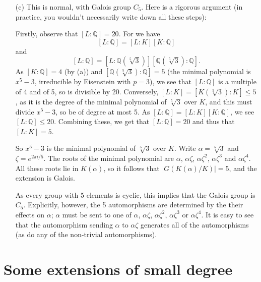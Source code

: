 \documentclass{amsart}
\newcommand{\Q}         {{\mathbb{Q}}}
\newcommand{\al}        {\alpha}
\newcommand{\zt}        {\zeta}
\renewcommand{\:}{\colon}
\newenvironment{solution}{\SolutionInline}{\endSolutionInline}
\theoremstyle{definition}
\renewenvironment{solution}{\SolutionAtEnd}{\endSolutionAtEnd}
\begin{document}
\begin{solution}
\begin{itemize}
  \item[(c)] This is normal, with Galois group $C_5$.  Here is a
   rigorous argument (in practice, you wouldn't necessarily write down
   all these steps):

   Firstly, observe that $[L:\Q]=20$. For we have
   \[ [L:\Q]=[L:K][K:\Q] \]
   and
   \[ [L:\Q]=[L:\Q(\sqrt[5]{3})][\Q(\sqrt[5]{3}):\Q]. \]
   As $[K:\Q]=4$ (by (a)) and $[\Q(\sqrt[5]{3}):\Q]=5$ (the minimal
   polynomial is $x^5-3$, irreducible by Eisenstein with $p=3$), we
   see that $[L:\Q]$ is a multiple of 4 and of 5, so is divisible by
   20. Conversely, $[L:K]=[K(\sqrt[5]{3}):K]\leq 5$, as it is the degree
   of the minimal polynomial of $\sqrt[5]{3}$ over $K$, and this must
   divide $x^5-3$, so be of degree at most 5. As $[L:\Q]=[L:K][K:\Q]$,
   we see $[L:\Q]\leq 20$. Combining these, we get that $[L:\Q]=20$ and
   thus that $[L:K]=5$.

   So $x^5-3$ is the minimal polynomial of $\sqrt[5]{3}$ over
   $K$. Write $\al=\sqrt[5]{3}$ and $\zt=e^{{2\pi i}/{5}}$. The roots
   of the minimal polynomial are $\al$, $\al\zt$, $\al\zt^2$,
   $\al\zt^3$ and $\al\zt^4$. All these roots lie in $K(\al)$, so it
   follows that $|G(K(\al)/K)|=5$, and the extension is Galois.

   As every group with 5 elements is cyclic, this implies that the
   Galois group is $C_5$. Explicitly, however, the 5 automorphisms are
   determined by the their effects on $\al$; $\al$ must be sent to one
   of $\al$, $\al\zt$, $\al\zt^2$, $\al\zt^3$ or $\al\zt^4$. It is
   easy to see that the automorphism sending $\al$ to $\al\zt$
   generates all of the automorphisms (as do any of the non-trivial
   automorphisms).
 \end{itemize}
\end{solution}

\section{Some extensions of small degree}
\label{sec-small}
\end{document}
